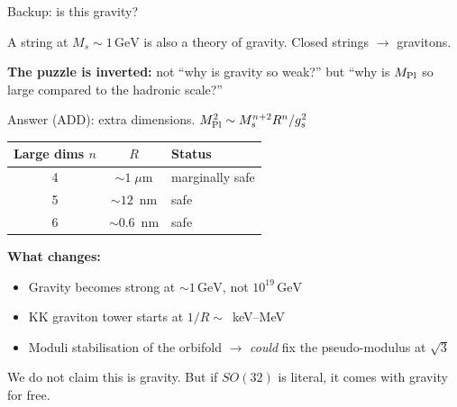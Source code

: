 \documentclass[aspectratio=169,12pt]{beamer}
\newcommand{\GeV}{\,\text{GeV}}
\begin{document}
\begin{frame}{Backup: is this gravity?}

A string at $M_s \sim 1\GeV$ is also a theory of gravity.
Closed strings $\to$ gravitons.

\bigskip
\textbf{The puzzle is inverted:} not ``why is gravity so weak?''
but ``why is $M_{\rm Pl}$ so large compared to the hadronic scale?''

\medskip
Answer (ADD): extra dimensions.
$M_{\rm Pl}^2 \sim M_s^{n+2} R^n / g_s^2$

\medskip
\begin{center}
\begin{tabular}{ccl}
\toprule
Large dims $n$ & $R$ & Status \\
\midrule
4 & $\sim 1\;\mu$m & marginally safe \\
5 & $\sim 12$~nm & safe \\
6 & $\sim 0.6$~nm & safe \\
\bottomrule
\end{tabular}
\end{center}

\bigskip
\textbf{What changes:}
\begin{itemize}
\item Gravity becomes strong at $\sim 1\GeV$, not $10^{19}\GeV$
\item KK graviton tower starts at $1/R \sim$~keV--MeV
\item Moduli stabilisation of the orbifold $\to$ \emph{could} fix
  the pseudo-modulus at $\sqrt{3}$
\end{itemize}

\medskip
We do not claim this is gravity. But if $SO(32)$ is literal,
it comes with gravity for free.

\end{frame}

\setcounter{framenumber}{\value{finalframe}}
\end{document}
